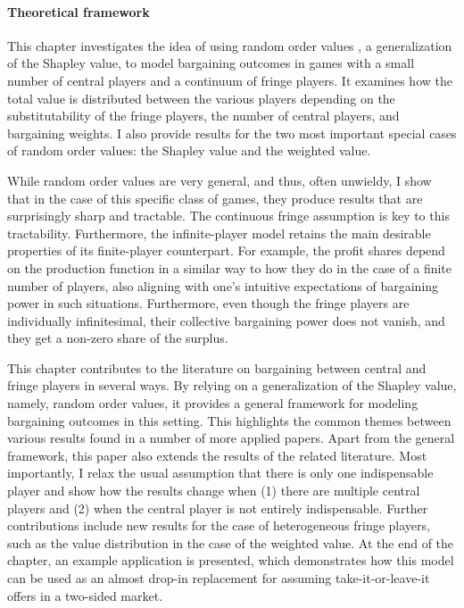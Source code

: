 \paragraph{Theoretical framework}
This chapter investigates the idea of using random order values \parencite{weber1988probabilistic}, a generalization of the Shapley value, to model bargaining outcomes in games with a small number of central players and a continuum of fringe players.
It examines how the total value is distributed between the various players depending on the substitutability of the fringe players, the number of central players, and bargaining weights.
I also provide results for the two most important special cases of random order values: the Shapley value and the weighted value.

While random order values are very general, and thus, often unwieldy, I show that in the case of this specific class of games, they produce results that are surprisingly sharp and tractable.
The continuous fringe assumption is key to this tractability.
Furthermore, the infinite-player model retains the main desirable properties of its finite-player counterpart.
For example, the profit shares depend on the production function in a similar way to how they do in the case of a finite number of players, also aligning with one's intuitive expectations of bargaining power in such situations.
Furthermore, even though the fringe players are individually infinitesimal, their collective bargaining power does not vanish, and they get a non-zero share of the surplus.

This chapter contributes to the literature on bargaining between central and fringe players in several ways.
By relying on a generalization of the Shapley value, namely, random order values, it provides a general framework for modeling bargaining outcomes in this setting.
This highlights the common themes between various results found in a number of more applied papers.
Apart from the general framework, this paper also extends the results of the related literature.
Most importantly, I relax the usual assumption that there is only one indispensable player and show how the results change when (1) there are multiple central players and (2) when the central player is not entirely indispensable.
Further contributions include new results for the case of heterogeneous fringe players, such as the value distribution in the case of the weighted value.
At the end of the chapter, an example application is presented, which demonstrates how this model can be used as an almost drop-in replacement for assuming take-it-or-leave-it offers in a two-sided market.

